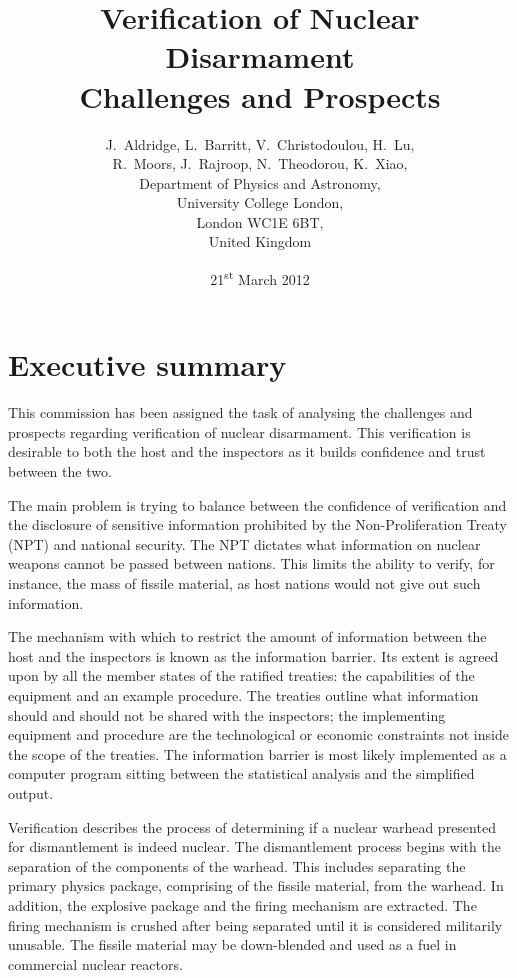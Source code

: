 \documentclass[twoside,titlepage,11pt,twocolumn,a4paper]{article}
\begin{document}
\title{Verification of Nuclear Disarmament \\
Challenges and Prospects}
\author{J.~Aldridge, L.~Barritt, V.~Christodoulou, H.~Lu, \\
	R.~Moors, J.~Rajroop, N.~Theodorou, K.~Xiao, \\
\small	Department of Physics and Astronomy, \\
\small	University College London, \\
\small	London WC1E 6BT, \\
\small	United Kingdom}
\date{21\textsuperscript{st} March 2012}
\maketitle

\onecolumn
\cleardoublepage

\section*{Executive summary}

This commission has been assigned the task of analysing the challenges
and prospects regarding verification of nuclear disarmament. This
verification is desirable to both the host and the inspectors as it
builds confidence and trust between the two.

The main problem is trying to balance between the confidence of
verification and the disclosure of sensitive information prohibited by
the Non-Proliferation Treaty (NPT) and national security. The NPT
dictates what information on nuclear weapons cannot be passed between
nations. This limits the ability to verify, for instance, the mass of
fissile material, as host nations would not give out such information.

The mechanism with which to restrict the amount of information between
the host and the inspectors is known as the information barrier. Its
extent is agreed upon by all the member states of the ratified
treaties: the capabilities of the equipment and an example
procedure. The treaties outline what information should and should not
be shared with the inspectors; the implementing equipment and
procedure are the technological or economic constraints not inside the
scope of the treaties. The information barrier is most likely
implemented as a computer program sitting between the statistical
analysis and the simplified output.

Verification describes the process of determining if a nuclear warhead
presented for dismantlement is indeed nuclear. The dismantlement
process begins with the separation of the components of the
warhead. This includes separating the primary physics package,
comprising of the fissile material, from the warhead. In addition, the
explosive package and the firing mechanism are extracted. The firing
mechanism is crushed after being separated until it is considered
militarily unusable. The fissile material may be down-blended and used
as a fuel in commercial nuclear reactors.
\end{document}
